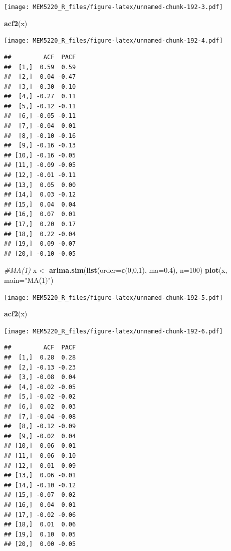\documentclass[]{book}
\newenvironment{Shaded}{\begin{snugshade}}{\end{snugshade}}
\newcommand{\CommentTok}[1]{\textcolor[rgb]{0.56,0.35,0.01}{\textit{#1}}}
\newcommand{\DataTypeTok}[1]{\textcolor[rgb]{0.13,0.29,0.53}{#1}}
\newcommand{\DecValTok}[1]{\textcolor[rgb]{0.00,0.00,0.81}{#1}}
\newcommand{\FloatTok}[1]{\textcolor[rgb]{0.00,0.00,0.81}{#1}}
\newcommand{\KeywordTok}[1]{\textcolor[rgb]{0.13,0.29,0.53}{\textbf{#1}}}
\newcommand{\NormalTok}[1]{#1}
\newcommand{\StringTok}[1]{\textcolor[rgb]{0.31,0.60,0.02}{#1}}
\begin{document}
\texttt{[image: MEM5220\_R\_files/figure-latex/unnamed-chunk-192-3.pdf]}

\begin{Shaded}
\begin{Highlighting}[]
\KeywordTok{acf2}\NormalTok{(x)}
\end{Highlighting}
\end{Shaded}

\texttt{[image: MEM5220\_R\_files/figure-latex/unnamed-chunk-192-4.pdf]}

\begin{verbatim}
##         ACF  PACF
##  [1,]  0.59  0.59
##  [2,]  0.04 -0.47
##  [3,] -0.30 -0.10
##  [4,] -0.27  0.11
##  [5,] -0.12 -0.11
##  [6,] -0.05 -0.11
##  [7,] -0.04  0.01
##  [8,] -0.10 -0.16
##  [9,] -0.16 -0.13
## [10,] -0.16 -0.05
## [11,] -0.09 -0.05
## [12,] -0.01 -0.11
## [13,]  0.05  0.00
## [14,]  0.03 -0.12
## [15,]  0.04  0.04
## [16,]  0.07  0.01
## [17,]  0.20  0.17
## [18,]  0.22 -0.04
## [19,]  0.09 -0.07
## [20,] -0.10 -0.05
\end{verbatim}

\begin{Shaded}
\begin{Highlighting}[]
\CommentTok{#MA(1)}
\NormalTok{x <-}\StringTok{ }\KeywordTok{arima.sim}\NormalTok{(}\KeywordTok{list}\NormalTok{(}\DataTypeTok{order=}\KeywordTok{c}\NormalTok{(}\DecValTok{0}\NormalTok{,}\DecValTok{0}\NormalTok{,}\DecValTok{1}\NormalTok{), }\DataTypeTok{ma=}\FloatTok{0.4}\NormalTok{), }\DataTypeTok{n=}\DecValTok{100}\NormalTok{)}
\KeywordTok{plot}\NormalTok{(x, }\DataTypeTok{main=}\StringTok{"MA(1)"}\NormalTok{) }
\end{Highlighting}
\end{Shaded}

\texttt{[image: MEM5220\_R\_files/figure-latex/unnamed-chunk-192-5.pdf]}

\begin{Shaded}
\begin{Highlighting}[]
\KeywordTok{acf2}\NormalTok{(x)}
\end{Highlighting}
\end{Shaded}

\texttt{[image: MEM5220\_R\_files/figure-latex/unnamed-chunk-192-6.pdf]}

\begin{verbatim}
##         ACF  PACF
##  [1,]  0.28  0.28
##  [2,] -0.13 -0.23
##  [3,] -0.08  0.04
##  [4,] -0.02 -0.05
##  [5,] -0.02 -0.02
##  [6,]  0.02  0.03
##  [7,] -0.04 -0.08
##  [8,] -0.12 -0.09
##  [9,] -0.02  0.04
## [10,]  0.06  0.01
## [11,] -0.06 -0.10
## [12,]  0.01  0.09
## [13,]  0.06 -0.01
## [14,] -0.10 -0.12
## [15,] -0.07  0.02
## [16,]  0.04  0.01
## [17,] -0.02 -0.06
## [18,]  0.01  0.06
## [19,]  0.10  0.05
## [20,]  0.00 -0.05
\end{verbatim}
\end{document}
